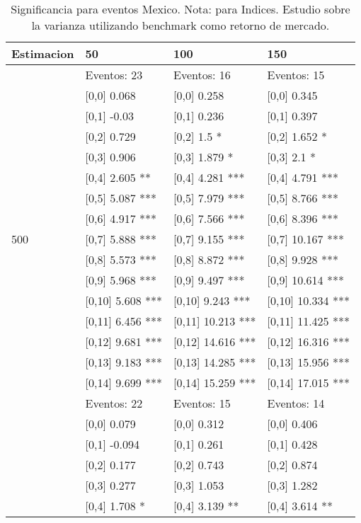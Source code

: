 \begin{table}

\caption{Significancia para eventos Mexico. Nota: para Indices. Estudio sobre la varianza utilizando benchmark como retorno de mercado.}
\centering
\begin{tabular}[t]{llll}
\toprule
Estimacion & 50 & 100 & 150\\
\midrule
 & Eventos:  23 & Eventos:  16 & Eventos:  15\\
 & {}[0,0] 0.068 & {}[0,0] 0.258 & {}[0,0] 0.345\\
 & {}[0,1] -0.03 & {}[0,1] 0.236 & {}[0,1] 0.397\\
 & {}[0,2] 0.729 & {}[0,2] 1.5 * & {}[0,2] 1.652 *\\
 & {}[0,3] 0.906 & {}[0,3] 1.879 * & {}[0,3] 2.1 *\\
\addlinespace
 & {}[0,4] 2.605 ** & {}[0,4] 4.281 *** & {}[0,4] 4.791 ***\\
 & {}[0,5] 5.087 *** & {}[0,5] 7.979 *** & {}[0,5] 8.766 ***\\
 & {}[0,6] 4.917 *** & {}[0,6] 7.566 *** & {}[0,6] 8.396 ***\\
500 & {}[0,7] 5.888 *** & {}[0,7] 9.155 *** & {}[0,7] 10.167 ***\\
 & {}[0,8] 5.573 *** & {}[0,8] 8.872 *** & {}[0,8] 9.928 ***\\
\addlinespace
 & {}[0,9] 5.968 *** & {}[0,9] 9.497 *** & {}[0,9] 10.614 ***\\
 & {}[0,10] 5.608 *** & {}[0,10] 9.243 *** & {}[0,10] 10.334 ***\\
 & {}[0,11] 6.456 *** & {}[0,11] 10.213 *** & {}[0,11] 11.425 ***\\
 & {}[0,12] 9.681 *** & {}[0,12] 14.616 *** & {}[0,12] 16.316 ***\\
 & {}[0,13] 9.183 *** & {}[0,13] 14.285 *** & {}[0,13] 15.956 ***\\
\addlinespace
 & {}[0,14] 9.699 *** & {}[0,14] 15.259 *** & {}[0,14] 17.015 ***\\
 & Eventos:  22 & Eventos:  15 & Eventos:  14\\
 & {}[0,0] 0.079 & {}[0,0] 0.312 & {}[0,0] 0.406\\
 & {}[0,1] -0.094 & {}[0,1] 0.261 & {}[0,1] 0.428\\
 & {}[0,2] 0.177 & {}[0,2] 0.743 & {}[0,2] 0.874\\
\addlinespace
 & {}[0,3] 0.277 & {}[0,3] 1.053 & {}[0,3] 1.282\\
 & {}[0,4] 1.708 * & {}[0,4] 3.139 ** & {}[0,4] 3.614 **\\

\end{tabular}
\end{table}
